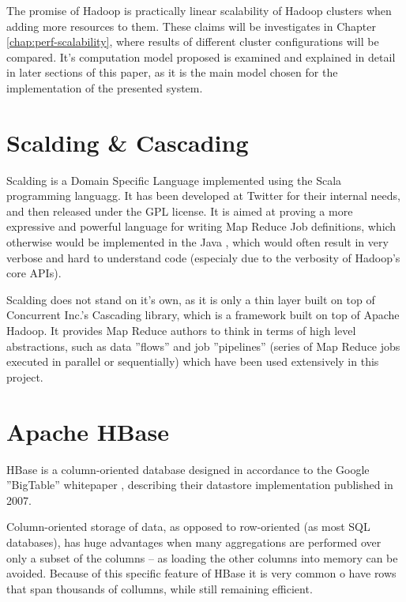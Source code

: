 The promise of Hadoop is practically linear scalability of Hadoop clusters when adding more resources to them. These claims will be investigates in Chapter \ref{chap:perf-scalability}, where results of different cluster configurations will be compared. It's computation model proposed is examined and explained in detail in later sections of this paper, as it is the main model chosen for the implementation of the presented system.

\section{Scalding \& Cascading}
\label{sec:scalding-info}

Scalding \cite{scalding} is a Domain Specific Language implemented using the Scala \cite{scala} programming languagg. It has been developed at Twitter \cite{twitter} for their internal needs, and then released under the GPL license. It is aimed at proving a more expressive and powerful language for writing Map Reduce Job definitions, which otherwise
would be implemented in the Java \cite{java}, which would often result in very verbose and hard to understand code (especialy due to the verbosity of Hadoop's core APIs).

Scalding does not stand on it's own, as it is only a thin layer built on top of Concurrent Inc.'s \cite{concurrent-inc} Cascading library, which is a framework built on top of Apache Hadoop. It provides Map Reduce authors to think in terms of high level abstractions, such as data ''flows'' and job ''pipelines'' (series of Map Reduce jobs executed in parallel or sequentially) which have been used extensively in this project.



\section{Apache HBase}
\label{sec:hbase}

HBase is a column-oriented database \cite{columnar-database} designed in accordance to the Google ''BigTable'' whitepaper \cite{big-table}, describing their datastore implementation published in 2007.

Column-oriented storage of data, as opposed to row-oriented (as most SQL databases), has huge advantages when many aggregations are performed over only a subset of the columns -- as loading the other columns into memory can be avoided. Because of this specific feature of HBase it is very common o have rows that span thousands of collumns, while still remaining efficient.

